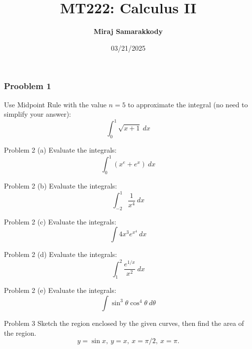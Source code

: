 \documentclass{beamer}
\title{MT222: Calculus II}
\author{\textbf{Miraj Samarakkody}}
\institute{Tougaloo College}
\date{03/21/2025}
\begin{document}
\begin{frame}
    \titlepage
\end{frame}

\begin{frame}
    \frametitle{Prooblem 1}
    Use Midpoint Rule with the value \(n=5\) to approximate the integral (no need to simplify your answer):
    \[
    \int_0^1 \sqrt{x+1}~dx
    \] 
\end{frame}

\begin{frame}{Problem 2 (a)}
    Evaluate the integrals:
    \[\displaystyle
    \int_0^1 (x^e+e^x)~dx
    \]
\end{frame}

\begin{frame}{Problem 2 (b)}
    Evaluate the integrals:
    \[\displaystyle
    \int_{-2}^1 \dfrac{1}{x^4}~dx
    \]
\end{frame}

\begin{frame}{Problem 2 (c)}
    Evaluate the integrals:
    \[\int 4x^3 e^{x^4}~dx
    \]
\end{frame}

\begin{frame}{Problem 2 (d)}
    Evaluate the integrals:
    \[\int_1^2 \dfrac{e^{1/x}}{x^2}~dx
    \]
\end{frame}


\begin{frame}{Problem 2 (e)}
    Evaluate the integrals:
    \[\int \sin^3 \theta \cos^4 \theta~d\theta
    \]
\end{frame}

\begin{frame}{Problem 3}
    Sketch the region enclosed by the given curves, then find the area of the region. \[
y= \sin x,~ y=x, ~x =\pi/2,~x=\pi.
\]
\end{frame}
\end{document}
